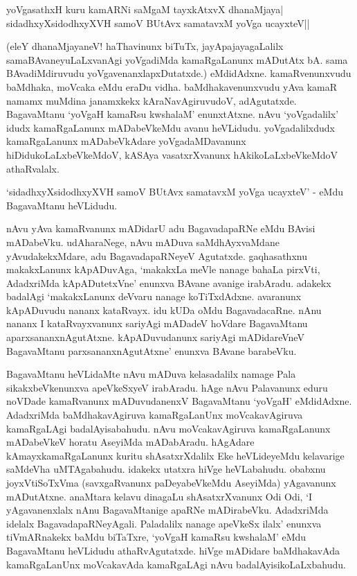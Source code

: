 \begin{shloka}
yoVgasathxH kuru kamARNi saMgaM tayxkAtxvX dhanaMjaya|\\
sidadhxyXsidodhxyXVH samoV BUtAvx samatavxM yoVga ucayxteV||
\end{shloka}

(eleY dhanaMjayaneV! haThavinunx biTuTx, jayApajayagaLalilx samaBAvaneyuLaLxvanAgi yoVgadiMda kamaRgaLanunx mADutAtx bA. sama BAvadiMdiruvudu yoVgavenanxlapxDutatxde.) eMdidAdxne. kamaRvenunxvudu baMdhaka, moVcaka eMdu eraDu vidha. baMdhakavenunxvudu yAva kamaR namamx muMdina janamxkekx kAraNavAgiruvudoV, adAgutatxde. BagavaMtanu `yoVgaH kamaRsu kwshalaM' enunxtAtxne. nAvu `yoVgadalilx' idudx kamaRgaLanunx mADabeVkeMdu avanu heVLidudu. yoVgadalilxdudx kamaRgaLanunx mADabeVkAdare yoVgadaMDavanunx hiDidukoLaLxbeVkeMdoV, kASAya vasatxrXvanunx hAkikoLaLxbeVkeMdoV athaRvalalx.

`sidadhxyXsidodhxyXVH samoV BUtAvx samatavxM yoVga ucayxteV' - eMdu BagavaMtanu heVLidudu.

nAvu yAva kamaRvanunx mADidarU adu BagavadapaRNe eMdu BAvisi mADabeVku. udAharaNege, nAvu mADuva saMdhAyxvaMdane yAvudakekxMdare, adu BagavadapaRNeyeV Agutatxde. gaqhasathxnu makakxLanunx kApADuvAga, `makakxLa meVle nanage bahaLa pirxVti, AdadxriMda kApADutetxVne' enunxva BAvane avanige irabAradu. adakekx badalAgi `makakxLanunx deVvaru nanage koTiTxdAdxne. avaranunx kApADuvudu nananx kataRvayx. idu kUDa oMdu BagavadacaRne. nAnu nananx I kataRvayxvanunx sariyAgi mADadeV hoVdare BagavaMtanu aparxsananxnAgutAtxne. kApADuvudanunx sariyAgi mADidareVneV BagavaMtanu parxsananxnAgutAtxne' enunxva BAvane barabeVku. 

BagavaMtanu heVLidaMte nAvu mADuva kelasadalilx namage Pala sikakxbeVkenunxva apeVkeSxyeV irabAradu. hAge nAvu Palavanunx eduru noVDade kamaRvanunx mADuvudanenxV BagavaMtanu `yoVgaH' eMdidAdxne. AdadxriMda baMdhakavAgiruva kamaRgaLanUnx moVcakavAgiruva kamaRgaLAgi badalAyisabahudu. nAvu moVcakavAgiruva kamaRgaLanunx mADabeVkeV horatu AseyiMda mADabAradu. hAgAdare kAmayxkamaRgaLanunx kuritu shAsatxrXdalilx Eke heVLideyeMdu kelavarige saMdeVha uMTAgabahudu. idakekx  utatxra hiVge heVLabahudu. obabxnu joyxVtiSoTxVma (savxgaRvanunx paDeyabeVkeMdu AseyiMda) yAgavanunx mADutAtxne. anaMtara kelavu dinagaLu shAsatxrXvanunx Odi Odi, `I yAgavanenxlalx nAnu BagavaMtanige apaRNe mADirabeVku. AdadxriMda idelalx BagavadapaRNeyAgali. Paladalilx nanage apeVkeSx ilalx' enunxva tiVmARnakekx baMdu biTaTxre, `yoVgaH kamaRsu kwshalaM' eMdu BagavaMtanu heVLidudu athaRvAgutatxde. hiVge mADidare baMdhakavAda kamaRgaLanUnx moVcakavAda kamaRgaLAgi nAvu badalAyisikoLaLxbahudu.

